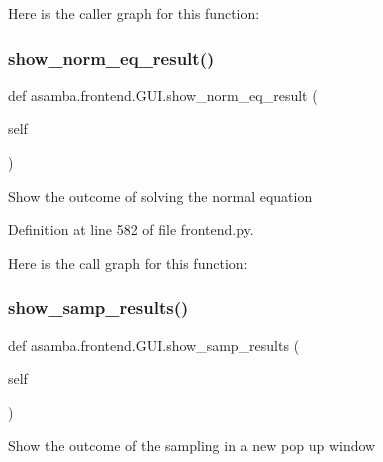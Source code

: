 Here is the caller graph for this function\+:
\mbox{\label{classasamba_1_1frontend_1_1_g_u_i_a863beb8817b0f728771fcb3323afb043}} 
\subsubsection{\texorpdfstring{show\+\_\+norm\+\_\+eq\+\_\+result()}{show\_norm\_eq\_result()}}
{\footnotesize\ttfamily def asamba.\+frontend.\+G\+U\+I.\+show\+\_\+norm\+\_\+eq\+\_\+result (\begin{DoxyParamCaption}\item[{}]{self }\end{DoxyParamCaption})}

\begin{DoxyVerb}Show the outcome of solving the normal equation \end{DoxyVerb}
 

Definition at line 582 of file frontend.\+py.

Here is the call graph for this function\+:
\mbox{\label{classasamba_1_1frontend_1_1_g_u_i_a2f99fe1402d07c15d79897c8ec0ee4e0}} 
\subsubsection{\texorpdfstring{show\+\_\+samp\+\_\+results()}{show\_samp\_results()}}
{\footnotesize\ttfamily def asamba.\+frontend.\+G\+U\+I.\+show\+\_\+samp\+\_\+results (\begin{DoxyParamCaption}\item[{}]{self }\end{DoxyParamCaption})}

\begin{DoxyVerb}Show the outcome of the sampling in a new pop up window \end{DoxyVerb}
 

